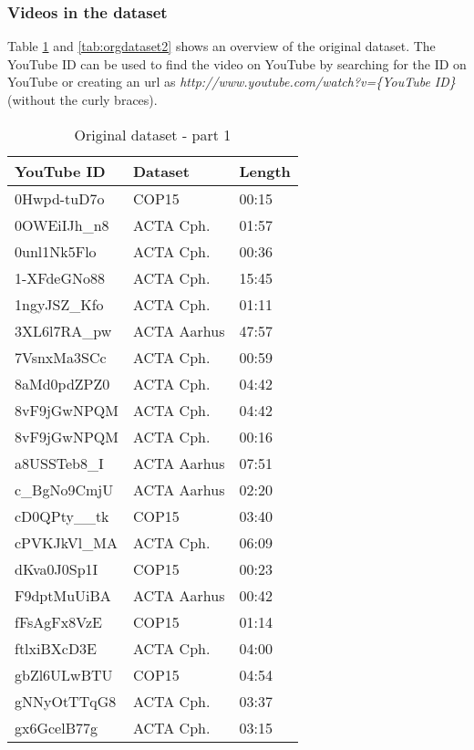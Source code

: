 \subsubsection{Videos in the dataset}
%
Table \ref{tab:orgdataset1} and \ref{tab:orgdataset2} shows an overview of the original dataset. The YouTube ID can be used to find the video on YouTube by searching for the ID on YouTube or creating an url as \emph{http://www.youtube.com/watch?v=\{YouTube ID\}} (without the curly braces).
%
\begin{table}[!ht]
	\begin{center}
	\caption{Original dataset - part 1}
	\label{tab:orgdataset1}
		\begin{tabular}{lll}
		\toprule
			YouTube ID & Dataset & Length \\
			\midrule
			0Hwpd-tuD7o & COP15 & 00:15 \\
			0OWEiIJh\_n8 & ACTA Cph. & 01:57 \\
			0unl1Nk5Flo & ACTA Cph. & 00:36 \\
			1-XFdeGNo88 & ACTA Cph. & 15:45 \\
			1ngyJSZ\_Kfo & ACTA Cph. & 01:11 \\
			3XL6l7RA\_pw & ACTA Aarhus & 47:57 \\
			7VsnxMa3SCc & ACTA Cph. & 00:59 \\
			8aMd0pdZPZ0 & ACTA Cph. & 04:42 \\
			8vF9jGwNPQM & ACTA Cph. & 04:42 \\
			8vF9jGwNPQM & ACTA Cph. & 00:16 \\
			a8USSTeb8\_I & ACTA Aarhus & 07:51 \\
			c\_BgNo9CmjU & ACTA Aarhus & 02:20 \\
			cD0QPty\_\_tk & COP15 & 03:40 \\
			cPVKJkVl\_MA & ACTA Cph. & 06:09 \\
			dKva0J0Sp1I & COP15 & 00:23 \\
			F9dptMuUiBA & ACTA Aarhus & 00:42 \\
			fFsAgFx8VzE & COP15 & 01:14 \\
			ftlxiBXcD3E & ACTA Cph. & 04:00 \\
			gbZl6ULwBTU & COP15 & 04:54 \\
			gNNyOtTTqG8 & ACTA Cph. & 03:37 \\
			gx6GcelB77g & ACTA Cph. & 03:15 \\

\end{tabular}
\end{center}
\end{table}
